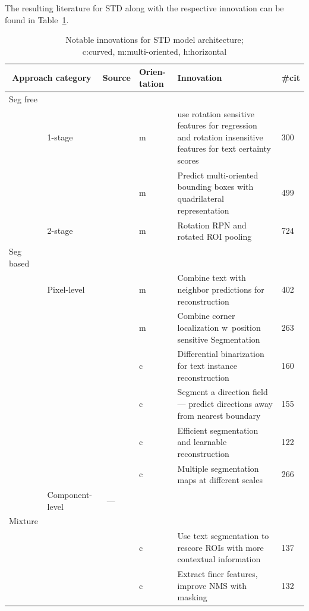 The resulting literature for \ac{STD} along with the respective innovation can be found in
Table~\ref{tb:STD-steps-properties}.
\begin{table}[h]
    \centering\scriptsize
    \begin{tabular}{p{}p{}p{}p{}
            p{}p{}}
        \multicolumn{2}{c}{\textbf{Approach category}} & \textbf{Source} & \textbf{Orien-tation}
                                                           & \textbf{Innovation} & \textbf{\#cit}\\
        \toprule
        Seg free & & \\
            & 1-stage &~\cite{liao_rotation-sensitive_2018} & m & use rotation sensitive features
                for regression and rotation insensitive features for text certainty scores & 300 \\
            & &~\cite{liao_textboxes_2018} & m & Predict multi-oriented bounding boxes with
                quadrilateral representation & 499 \\
            & 2-stage &~\cite{ma_arbitrary-oriented_2018} & m & Rotation RPN and rotated \ac{ROI}
                pooling & 724 \\
        \midrule
        Seg based & & \\
            & Pixel-level &~\cite{deng_pixellink_2018} & m & Combine text with neighbor predictions for
               reconstruction & 402 \\
            & &~\cite{lyu_multi-oriented_2018} & m & Combine corner localization w\ position sensitive
               Segmentation & 263\\
            & &~\cite{liao_real-time_2019} & c & Differential binarization for
                text instance reconstruction  & 160\\
            & &~\cite{xu_textfield_2019} & c & Segment a direction field --- predict directions away
               from nearest boundary & 155 \\
            & &~\cite{wang_efficient_2019} & c & Efficient segmentation and learnable reconstruction
               & 122 \\
            & &~\cite{wang_shape_2019} & c & Multiple segmentation maps at different scales & 266 \\
            & Component-level &~--- & & & \\
        \midrule
        Mixture & & \\
            & &~\cite{xie_scene_2018} & c & Use text segmentation to rescore \acp{ROI} with more
                contextual information & 137 \\
            & &~\cite{dai_fused_2018} & c & Extract finer features, improve \ac{NMS} with masking
                & 132 \\
        \bottomrule
    \end{tabular}
    \captionsetup{justification=centering}
    \caption[Notable innovations for STD model architecture]{%
        Notable innovations for STD model architecture; \\
        c:curved, m:multi-oriented, h:horizontal\label{tb:STD-steps-properties}
    }
\end{table}
